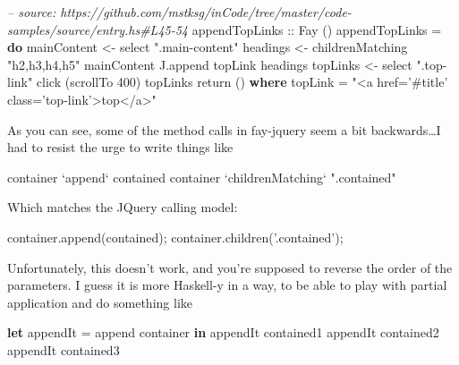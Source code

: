 \documentclass[]{article}
\newenvironment{Shaded}{}{}
\newcommand{\KeywordTok}[1]{\textcolor[rgb]{0.00,0.44,0.13}{\textbf{#1}}}
\newcommand{\DataTypeTok}[1]{\textcolor[rgb]{0.56,0.13,0.00}{#1}}
\newcommand{\DecValTok}[1]{\textcolor[rgb]{0.25,0.63,0.44}{#1}}
\newcommand{\StringTok}[1]{\textcolor[rgb]{0.25,0.44,0.63}{#1}}
\newcommand{\CommentTok}[1]{\textcolor[rgb]{0.38,0.63,0.69}{\textit{#1}}}
\newcommand{\OtherTok}[1]{\textcolor[rgb]{0.00,0.44,0.13}{#1}}
\newcommand{\FunctionTok}[1]{\textcolor[rgb]{0.02,0.16,0.49}{#1}}
\newcommand{\VariableTok}[1]{\textcolor[rgb]{0.10,0.09,0.49}{#1}}
\newcommand{\OperatorTok}[1]{\textcolor[rgb]{0.40,0.40,0.40}{#1}}
\newcommand{\AttributeTok}[1]{\textcolor[rgb]{0.49,0.56,0.16}{#1}}
\newcommand{\NormalTok}[1]{#1}
\begin{document}
\begin{Shaded}
\begin{Highlighting}[]
\CommentTok{-- source: https://github.com/mstksg/inCode/tree/master/code-samples/source/entry.hs#L45-54}
\OtherTok{appendTopLinks ::} \DataTypeTok{Fay}\NormalTok{ ()}
\NormalTok{appendTopLinks }\FunctionTok{=} \KeywordTok{do}
\NormalTok{  mainContent }\OtherTok{<-}\NormalTok{ select }\StringTok{".main-content"}
\NormalTok{  headings }\OtherTok{<-}\NormalTok{ childrenMatching }\StringTok{"h2,h3,h4,h5"}\NormalTok{ mainContent}
\NormalTok{  J.append topLink headings}
\NormalTok{  topLinks }\OtherTok{<-}\NormalTok{ select }\StringTok{".top-link"}
\NormalTok{  click (scrollTo }\DecValTok{400}\NormalTok{) topLinks}
\NormalTok{  return ()}
  \KeywordTok{where}
\NormalTok{    topLink }\FunctionTok{=} \StringTok{"<a href='#title' class='top-link'>top</a>"}
\end{Highlighting}
\end{Shaded}

As you can see, some of the method calls in fay-jquery seem a bit
backwards\ldots{}I had to resist the urge to write things like

\begin{Shaded}
\begin{Highlighting}[]
\NormalTok{container }\OtherTok{`append`}\NormalTok{ contained}
\NormalTok{container }\OtherTok{`childrenMatching`} \StringTok{".contained"}
\end{Highlighting}
\end{Shaded}

Which matches the JQuery calling model:

\begin{Shaded}
\begin{Highlighting}[]
\VariableTok{container}\NormalTok{.}\AttributeTok{append}\NormalTok{(contained)}\OperatorTok{;}
\VariableTok{container}\NormalTok{.}\AttributeTok{children}\NormalTok{(}\StringTok{'.contained'}\NormalTok{)}\OperatorTok{;}
\end{Highlighting}
\end{Shaded}

Unfortunately, this doesn't work, and you're supposed to reverse the order of
the parameters. I guess it is more Haskell-y in a way, to be able to play with
partial application and do something like

\begin{Shaded}
\begin{Highlighting}[]
\KeywordTok{let}
\NormalTok{  appendIt }\FunctionTok{=}\NormalTok{ append container}
\KeywordTok{in}
\NormalTok{  appendIt contained1}
\NormalTok{  appendIt contained2}
\NormalTok{  appendIt contained3}
\end{Highlighting}
\end{Shaded}
\end{document}
